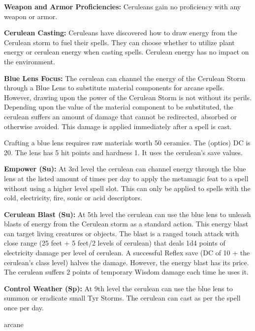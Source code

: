 {
\textbf{Weapon and Armor Proficiencies:} Ceruleans gain no proficiency with any weapon or armor.

\textbf{Cerulean Casting:} Ceruleans have discovered how to draw energy from the Cerulean storm to fuel their spells. They can choose whether to utilize plant energy or cerulean energy when casting spells. Cerulean energy has no impact on the environment.

\textbf{Blue Lens Focus:} The cerulean can channel the energy of the Cerulean Storm through a Blue Lens to substitute material components for arcane spells. However, drawing upon the power of the Cerulean Storm is not without its perils. Depending upon the value of the material component to be substituted, the cerulean suffers an amount of damage that cannot be redirected, absorbed or otherwise avoided. This damage is applied immediately after a spell is cast.


Crafting a blue lens requires raw materials worth 50 ceramics. The  (optics) DC is 20. The lens has 5 hit points and hardness 1. It uses the cerulean’s save values.

\textbf{Empower (Su):} At 3rd level the cerulean can channel energy through the blue lens at the listed amount of times per day to apply the metamagic feat  to a spell without using a higher level spell slot. This can only be applied to spells with the cold, electricity, fire, sonic or acid descriptors.

\textbf{Cerulean Blast (Su):} At 5th level the cerulean can use the blue lens to unleash blasts of energy from the Cerulean storm as a standard action. This energy blast can target living creatures or objects. The blast is a ranged touch attack with close range (25 feet + 5 feet/2 levels of cerulean) that deals 1d4 points of electricity damage per level of cerulean. A successful Reflex save (DC of 10 + the cerulean’s class level) halves the damage. However, the energy blast has its price. The cerulean suffers 2 points of temporary Wisdom damage each time he uses it.

\textbf{Control Weather (Sp):} At 9th level the cerulean can use the blue lens to summon or eradicate small Tyr Storms. The cerulean can cast  as per the spell once per day.
}
{}
{arcane}
{}
{}
{}